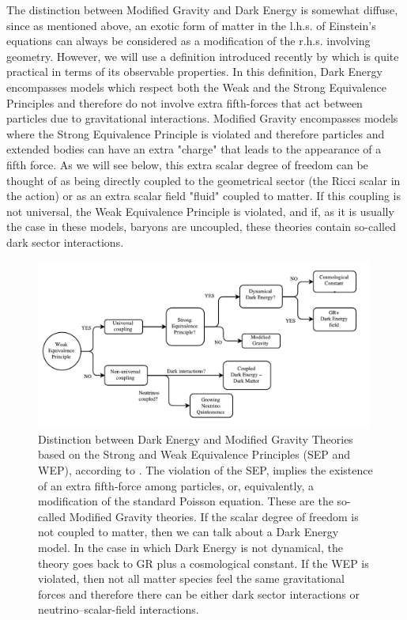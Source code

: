The distinction between Modified Gravity and Dark Energy is somewhat diffuse, since as mentioned above, 
an exotic form of matter in the l.h.s. of Einstein's equations can always be considered as a modification 
of the r.h.s. involving geometry. However, we will use a definition introduced recently by \cite{cite Joyce, Lombrisier, Schmidt}
which is quite practical in terms of its observable properties. 
In this definition, Dark Energy encompasses models which respect both the Weak and the Strong Equivalence
Principles and therefore do not involve extra fifth-forces that act between particles due to gravitational 
interactions. Modified Gravity encompasses models where the Strong Equivalence Principle is violated and therefore 
particles and extended bodies can have an extra "charge" that leads to the appearance of a fifth force.
As we will see below, this extra scalar degree of freedom can be thought of as being directly coupled
to the geometrical sector (the Ricci scalar in the action) or as an extra scalar field "fluid" 
coupled to matter.
If this coupling is not universal, the Weak Equivalence Principle is violated, and if, as it is 
usually the case in these models, baryons are uncoupled, these theories contain so-called 
dark sector interactions.

\begin{figure}[H]

\begin{center}
\includegraphics[width=0.99\textwidth]
{Figures/DE-MG.pdf}
\end{center}
\caption[Dark Energy - Modified Gravity Flowchart]{Distinction between Dark Energy and
Modified Gravity Theories based on the Strong and Weak Equivalence Principles (SEP and WEP), according to \cite{Joyce, Lombrisier}.
The violation of the SEP, implies the existence of an extra fifth-force among particles, 
or, equivalently, a modification of the standard Poisson equation. These are the so-called Modified Gravity theories.
If the scalar degree of freedom is not coupled to matter, then we can talk about a Dark Energy model.
In the case in which Dark Energy is not dynamical, the theory goes back to GR plus a cosmological constant.
If the WEP is violated, then not all matter species feel the same gravitational forces and therefore
there can be either dark sector interactions or neutrino--scalar-field interactions.
}\label{fig:DE-vs-MG-WEP-SEP}
\end{figure}

